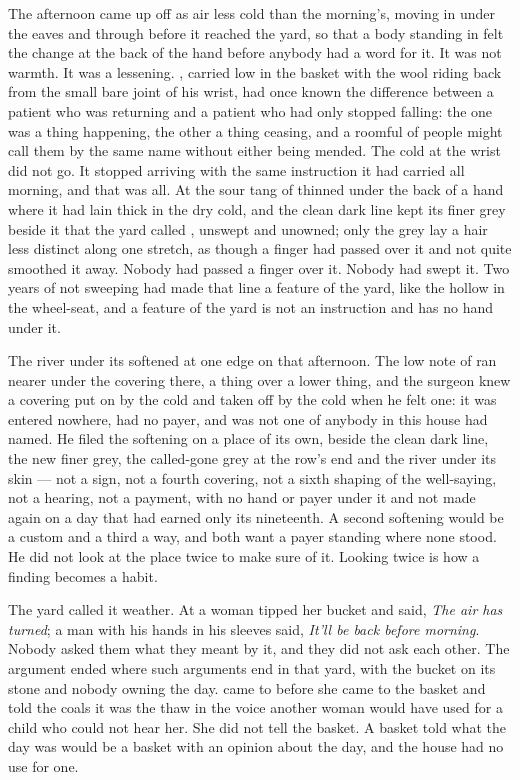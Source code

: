 The afternoon came up off  as air less cold than the morning's, moving in under the eaves and through  before it reached the yard, so that a body standing in  felt the change at the back of the hand before anybody had a word for it. It was not warmth. It was a lessening. , carried low in the basket with the wool riding back from the small bare joint of his wrist, had once known the difference between a patient who was returning and a patient who had only stopped falling: the one was a thing happening, the other a thing ceasing, and a roomful of people might call them by the same name without either being mended. The cold at the wrist did not go. It stopped arriving with the same instruction it had carried all morning, and that was all. At  the sour tang of  thinned under the back of a hand where it had lain thick in the dry cold, and the clean dark line kept its finer grey beside it that the yard called , unswept and unowned; only the grey lay a hair less distinct along one stretch, as though a finger had passed over it and not quite smoothed it away. Nobody had passed a finger over it. Nobody had swept it. Two years of not sweeping had made that line a feature of the yard, like the hollow in the wheel-seat, and a feature of the yard is not an instruction and has no hand under it.

The river under its  softened at one edge on that afternoon. The low note of  ran nearer under the covering there, a thing over a lower thing, and the surgeon knew a covering put on by the cold and taken off by the cold when he felt one: it was entered nowhere, had no payer, and was not one of  anybody in this house had named. He filed the softening on a place of its own, beside the clean dark line, the new finer grey, the called-gone grey at the row's end and the river under its skin --- not a sign, not a fourth covering, not a sixth shaping of the well-saying, not a hearing, not a payment, with no hand or payer under it and not made again on a day that had earned only its nineteenth. A second softening would be a custom and a third a way, and both want a payer standing where none stood. He did not look at the place twice to make sure of it. Looking twice is how a finding becomes a habit.

The yard called it weather. At  a woman tipped her bucket and said, \emph{The air has turned}; a man with his hands in his sleeves said, \emph{It'll be back before morning}. Nobody asked them what they meant by it, and they did not ask each other. The argument ended where such arguments end in that yard, with the bucket on its stone and nobody owning the day.  came to  before she came to the basket and told the coals it was the thaw in the voice another woman would have used for a child who could not hear her. She did not tell the basket. A basket told what the day was would be a basket with an opinion about the day, and the house had no use for one.

